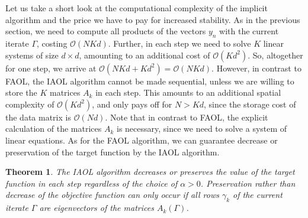 \documentclass[11pt, onecolumn, journal,compsoc]{IEEEtran}
\newcommand{\Ocal}{\mathcal{O}}
\theoremstyle{plain}
\newtheorem{theorem}{Theorem}[section]
\theoremstyle{remark}
\begin{document}
Let us take a short look at the computational complexity of the implicit algorithm and the price we have to pay for increased stability. As in the previous section, we need to compute all products of the vectors $y_n$ with the current iterate $\Gamma$, costing $\Ocal(NKd)$. Further, in each step we need to solve $K$ linear systems of size $d\times d$, amounting to an additional cost of $\Ocal(Kd^2)$. So, altogether for one step, we arrive at $\Ocal(NKd+Kd^2)=\Ocal(NKd)$. 
However, in contrast to FAOL, the IAOL algorithm cannot be made sequential, unless we are willing to store the $K$ matrices $A_k$ in each step. This amounts to an additional spatial complexity of $\Ocal(Kd^2)$, and only pays off for $N>Kd$, since the storage cost of the data matrix is $\Ocal(Nd)$. Note that in contrast to FAOL, the explicit calculation of the matrices $A_k$ is necessary, since we need to solve a system of linear equations.
%
As for the FAOL algorithm, we can guarantee decrease or preservation of the target function by the IAOL algorithm.

\begin{theorem}\label{thm:IAOLdecrease}
	The IAOL algorithm decreases or preserves the value of the target function in each step regardless of the choice of $\alpha>0$. Preservation rather than decrease of the objective function can only occur if all rows $\gamma_k$ of the current iterate $\Gamma$ are eigenvectors of the matrices $A_k(\Gamma)$.
\end{theorem} 
\end{document}

